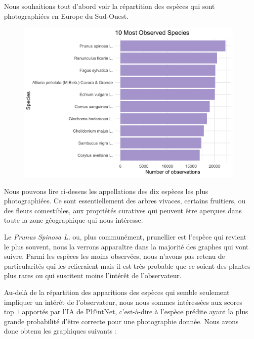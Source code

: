 \documentclass[a4paper,12pt]{article}
\begin{document}
Nous souhaitions tout d'abord voir la répartition des espèces qui sont photographiées en Europe du Sud-Ouest.

\begin{figure}[H]
  \centering
  \includegraphics[scale=0.3]{images/10_Most_Observed_Species.png}
  \label{fig1}
\end{figure}

Nous pouvons lire ci-dessus les appellations des dix espèces les plus photographiées. Ce sont essentiellement des arbres vivaces, certains fruitiers, ou des fleurs comestibles, aux propriétés curatives qui peuvent être aperçues dans toute la zone géographique qui nous intéresse. 

\vspace{0.2cm}

Le \textit{Prunus Spinosa L.} ou, plus communément, prunellier est l'espèce qui revient le plus souvent, nous la verrons apparaître dans la majorité des graphes qui vont suivre. Parmi les espèces les moins observées, nous n'avons pas retenu de particularités qui les relieraient mais il est très probable que ce soient des plantes plus rares ou qui suscitent moins l'intérêt de l'observateur.

\vspace{0.2cm}

Au-delà de la répartition des apparitions des espèces qui semble seulement impliquer un intérêt de l'observateur, nous nous sommes intéressées aux scores top $1$ apportés par l'IA de Pl@ntNet, c'est-à-dire à l'espèce prédite ayant la plus grande probabilité d'être correcte pour une photographie donnée. Nous avons donc obtenu les graphiques suivants :
\end{document}
